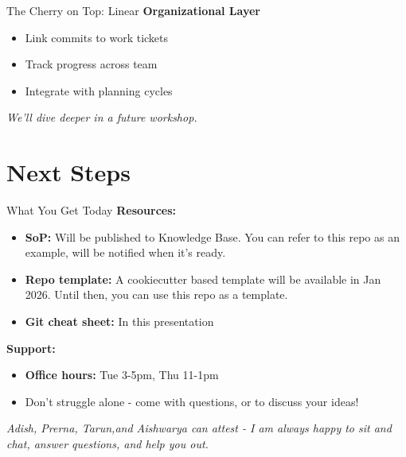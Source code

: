 \documentclass{beamer}
\begin{document}
\begin{frame}{The Cherry on Top: Linear}
\textbf{Organizational Layer}

\vspace{1em}
\begin{itemize}
    \item Link commits to work tickets
    \item Track progress across team
    \item Integrate with planning cycles
\end{itemize}

\vspace{1em}
\textit{We'll dive deeper in a future workshop.}
\end{frame}

\section{Next Steps}

\begin{frame}{What You Get Today}
    \textbf{Resources:}
    \begin{itemize}
        \item \textbf{SoP:} Will be published to Knowledge Base. You can refer to this repo as an example, will be notified when it's ready.
        \item \textbf{Repo template:} A cookiecutter based template will be available in Jan 2026. Until then, you can use this repo as a template.
        \item \textbf{Git cheat sheet:} In this presentation
    \end{itemize}
    
    \vspace{1em}
    \textbf{Support:}
    \begin{itemize}
        \item \textbf{Office hours:} Tue 3-5pm, Thu 11-1pm
        \item Don't struggle alone - come with questions, or to discuss your ideas!
    \end{itemize}

    \vspace{1em}
    \small
    \textit{Adish, Prerna, Tarun,and Aishwarya can attest - I am always happy to sit and chat, answer questions, and help you out.}
    \end{frame}
\end{document}
